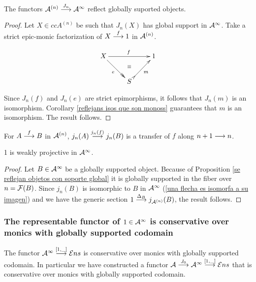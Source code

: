 \begin{proposition}\label{se reflejan objetos con soporte global}
The functors $\mathcal{A}^{(n)} \overset {J_n} {\longrightarrow} \mathcal{A}^\infty$ reflect globally suported objects.
\end{proposition}

\begin{proof}
Let $X \in cc{A}^{(n)}$ be such that $J_n(X)$ has global support in $\mathcal{A}^\infty$.  Take a strict epic-monic factorization of $X \overset {f} {\longrightarrow} 1$ in $\mathcal{A}^{(n)}$.

\[
\newdir{(>}{{}*!/-6pt/\dir{>}}
\xymatrix{X \ar[rr]^f \ar@{->>}[dr]_e && 1    \\
		   & S \ar@{(>->}[ur]_m \ar@{}[u]|(.6)\equiv &  }
\]

Since $J_n(f)$ and $J_n(e)$ are strict epimorphisms, it follows that $J_n(m)$ is an isomorphism. Corollary \ref{reflejans isos que son monoss} guarantees that $m$ is an isomorphism. The result follows.
\end{proof}

\begin{remark}\label{una flecha es isomorfa a su imagen}
For $A \overset {f} {\longrightarrow} B$ in ${\mathcal{A}^{(n)}}$, $j_{n}(A) \overset {j_{n}(f)} {\longrightarrow} j_{n}(B)$ is a transfer of $f$ along ${n+1 \overset {} {\longrightarrow} n}$.
\end{remark}

\begin{theorem}
1 is weakly projective in $\mathcal{A}^\infty$.
\end{theorem}

\begin{proof}
Let $B \in \mathcal{A}^\infty$ be a globally supported object. Because of Proposition \ref{se reflejan objetos con soporte global} it is globally supported in the fiber over $n=\mathcal{F}(B)$. Since $j_{n}(B)$ is isomorphic to $B$ in $\mathcal{A}^\infty$ (\ref{una flecha es isomorfa a su imagen}) and we have the generic section $1 \overset {\Delta_B} {\longrightarrow} j_{\mathcal{A}^{(n)}}(B)$, the result follows. 
\end{proof}


\subsubsection{The representable functor of $1 \in \mathcal{A}^{\infty}$ is conservative over monics with globally supported codomain}


\begin{theorem} \label{obtuvimos un modelo loco}
 
The functor $\mathcal{A}^\infty \overset {[1,\_]} {\longrightarrow} \mathcal{E}ns$ is conservative over monics with globally supported codomain. In particular we have constructed a functor $\mathcal{A} \overset {J_0} {\longrightarrow} \mathcal{A}^\infty \overset {[1,\_]} {\longrightarrow} \mathcal{E}ns$ that is conservative over monics with globally supported codomain.
\end{theorem}

